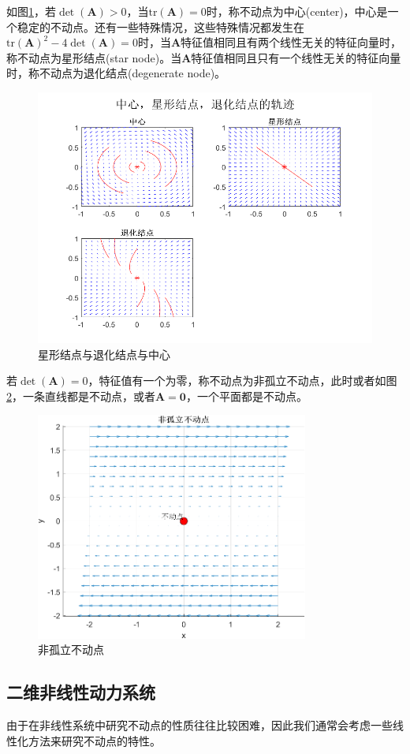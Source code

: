 如图\ref{fig:star}，若$\det(\mathbf{A})>0$，当$\text{tr}(\mathbf{A})=0$时，称不动点为中心(center)，中心是一个稳定的不动点。还有一些特殊情况，这些特殊情况都发生在$\text{tr}(\mathbf{A})^2-4\det(\mathbf{A})=0$时，当$\mathbf{A}$特征值相同且有两个线性无关的特征向量时，称不动点为星形结点(star node)。当$\mathbf{A}$特征值相同且只有一个线性无关的特征向量时，称不动点为退化结点(degenerate node)。
\begin{figure}[H]
    \centering
    \includegraphics[width=.7\linewidth]{Img/star.png}
    \caption{星形结点与退化结点与中心}
    \label{fig:star}
\end{figure}

若$\det(\mathbf{A})=0$，特征值有一个为零，称不动点为非孤立不动点，此时或者如图\ref{fig:nonisolate}，一条直线都是不动点，或者$\mathbf{A}=\mathbf{0}$，一个平面都是不动点。
\begin{figure}[H]
    \centering
    \includegraphics[width=0.8\textwidth]{Img/nonisolate.png}
    \caption{非孤立不动点}
    \label{fig:nonisolate}
\end{figure}
\subsection{二维非线性动力系统}
由于在非线性系统中研究不动点的性质往往比较困难，因此我们通常会考虑一些线性化方法来研究不动点的特性。

